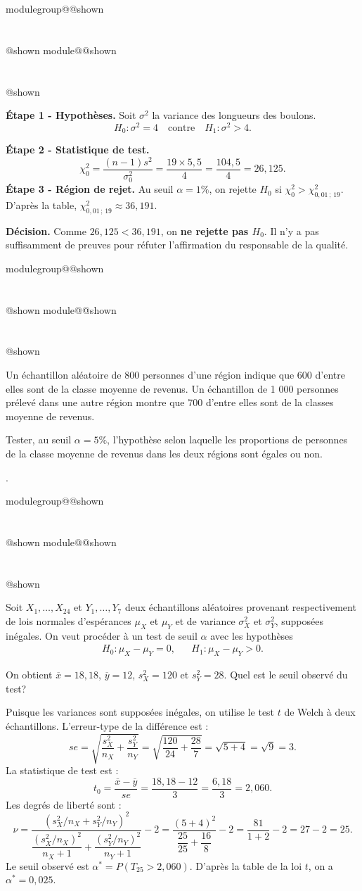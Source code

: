 \documentclass{Evaluation}
\makeatletter
\newcommand{\currentmodulekey}{}
\newcommand{\currentmoduletitle}{}
\newcommand{\currentgroupkey}{}
\newcommand{\currentgrouptitle}{}
\newcommand{\showmoduleifneeded}{%
  \ifx\currentgroupkey\empty\else
    \expandafter\ifx\csname modulegroup@\currentgroupkey @shown\endcsname\relax
      \section*{\currentgrouptitle}%
      \expandafter\gdef\csname modulegroup@\currentgroupkey @shown\endcsname{1}%
    \fi
  \fi
  \expandafter\ifx\csname module@\currentmodulekey @shown\endcsname\relax
    \section*{\currentmoduletitle}%
    \expandafter\gdef\csname module@\currentmodulekey @shown\endcsname{1}%
  \fi
}
\newenvironment{A23}{\showmoduleifneeded}{}
\newenvironment{A24}{\showmoduleifneeded}{}
\newenvironment{H26}{\showmoduleifneeded}{}
\makeatother
\begin{document}
\begin{questions}
\begin{A23}
\begin{solution}
\textbf{Étape 1 - Hypothèses.} Soit $\sigma^2$ la variance des longueurs des boulons.
\[
H_0: \sigma^2 = 4 \quad \text{contre} \quad H_1: \sigma^2 > 4.
\]

\textbf{Étape 2 - Statistique de test.}
\[
\chi^2_0 = \frac{(n-1)s^2}{\sigma_0^2} = \frac{19 \times 5{,}5}{4} = \frac{104{,}5}{4} = 26{,}125.
\]
\textbf{Étape 3 - Région de rejet.} Au seuil $\alpha=1\%$, on rejette $H_0$ si $\chi^2_0 > \chi^2_{0{,}01\,;\,19}$. D'après la table, $\chi^2_{0{,}01\,;\,19} \approx 36{,}191$.

\textbf{Décision.} Comme $26{,}125 < 36{,}191$, on \textbf{ne rejette pas $H_0$}. Il n'y a pas suffisamment de preuves pour réfuter l'affirmation du responsable de la qualité.
\end{solution}
\end{A23}

\begin{A24}
\question {} %
Un échantillon aléatoire de 800 personnes d'une région indique que
600 d'entre elles sont de la classe moyenne de revenus. Un
échantillon de 1 000 personnes prélevé dans une autre région montre
que 700 d'entre elles sont de la classes moyenne de revenus.

Tester, au seuil $\alpha=5\%$, l'hypothèse
selon laquelle les proportions de personnes de la classe moyenne de
revenus dans les deux régions sont égales ou non.

.
\end{A24}

\begin{H26}
\question {} %
Soit $X_1,\hdots,X_{24}$ et $Y_1,\hdots,Y_{7}$ deux échantillons aléatoires provenant respectivement de lois normales d'espérances $\mu_X$ et $\mu_Y$ et de variance $\sigma^2_X$ et $\sigma^2_Y$, supposées inégales.
On veut procéder à un test de seuil $\alpha$ avec les hypothèses
\begin{align*}
    H_0:\mu_X-\mu_Y=0, & & H_1:\mu_X-\mu_Y>0.
\end{align*}

On obtient $\overline{x}=18,18$, $\overline{y}=12$, $s_X^2=120$ et $s_Y^2=28$. Quel est le seuil observé du test?

\begin{solution}
Puisque les variances sont supposées inégales, on utilise le test $t$ de Welch à deux échantillons. L'erreur-type de la différence est :
$$se=\sqrt{\frac{s_X^2}{n_X}+\frac{s_Y^2}{n_Y}}=\sqrt{\frac{120}{24}+\frac{28}{7}}=\sqrt{5+4}=\sqrt{9}=3.$$
La statistique de test est :
$$t_0=\frac{\overline{x}-\overline{y}}{se}=\frac{18,18-12}{3}=\frac{6,18}{3}=2,060.$$
Les degrés de liberté sont :
$$\nu=\frac{(s_X^2/n_X+s_Y^2/n_Y)^2}{\dfrac{(s_X^2/n_X)^2}{n_X+1}+\dfrac{(s_Y^2/n_Y)^2}{n_Y+1}}-2=\frac{(5+4)^2}{\dfrac{25}{25}+\dfrac{16}{8}}-2=\frac{81}{1+2}-2=27-2=25.$$
Le seuil observé est $\alpha^*=P(T_{25}>2,060)$. D'après la table de la loi $t$, on a $\alpha^*=0,025$.
\end{solution}
\end{H26}


\end{questions}
\end{document}

